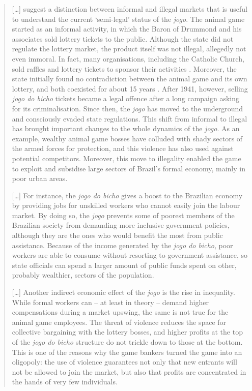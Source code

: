 \documentclass[a4paper,12pt]{article}
\begin{document}
\begin{quote}
	[\dots]  \citet{cross2006risk} suggest a distinction between informal and illegal markets that is useful to understand the current `semi-legal' status of the \textit{jogo}. The animal game started as an informal activity, in which the Baron of Drummond and his associates sold lottery tickets to the public. Although the state did not regulate the lottery market, the product itself was not illegal, allegedly not even immoral. In fact, many organisations, including the Catholic Church, sold raffles and lottery tickets to sponsor their activities \citep[49]{torcato2011repressao}. Moreover, the state initially found no contradiction between the animal game and its own lottery, and both coexisted for about 15 years \citep[559]{chazkel2007beyond}. After 1941, however, selling \textit{jogo do bicho} tickets became a legal offence after a long campaign asking for its criminalisation. Since then, the \textit{jogo} has moved to the underground and consciously evaded state regulations. This shift from informal to illegal has brought important changes to the whole dynamics of the \textit{jogo}. As an example, wealthy animal game bosses have colluded with shady sectors of the armed forces for protection, and this violence has also used against potential competitors. Moreover, this move to illegality enabled the game to exploit and subsidise large sectors of Brazil's formal economy, mainly in poor urban areas.

	[\dots] For instance, the \textit{jogo do bicho} gives a boost to the Brazilian economy by providing jobs for unskilled workers who cannot easily join the labour market. By doing so, the \textit{jogo} prevents some of poorest members of the Brazilian society from demanding more inclusive government policies, although they are the ones who would benefit the most from public assistance. Because of the income generated by the \textit{jogo do bicho}, poor workers are able to consume without resorting to government assistance, so state officials can spend a larger amount of public funds spent on other, probably wealthier, sectors of the population.

	[\dots] Another indirect economic effect of the \textit{jogo} is the rise in inequality. While formal workers can -- at least in theory -- demand higher compensations during a market upswing, the same is not true for the animal game employees. The threat of violence reduces the space for collective bargaining with the lottery bosses, and higher profits at the top of the \textit{jogo do bicho} structure do not trickle down to those at the bottom. This is one of the reasons why the game bankers turned the game into an oligopoly: the use of violence guarantees not only that new entrants will not be allowed to join the market, but also that profits are concentrated in the hands of very few individuals.  
\end{quote}
\end{document}
